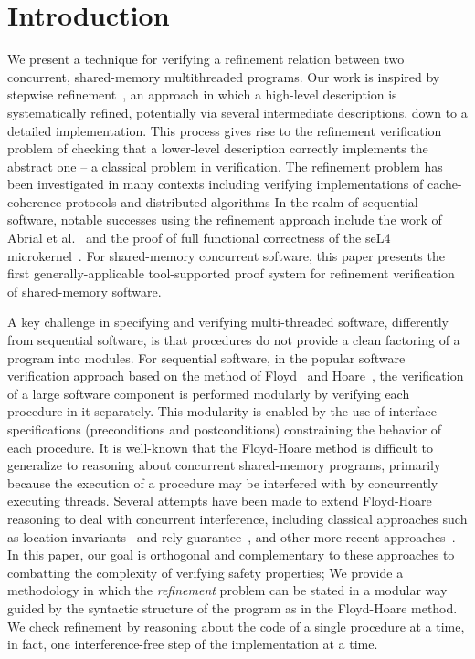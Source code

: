 \section{Introduction}
\label{sec:introduction}

We present a technique for verifying a refinement relation between two concurrent, shared-memory multithreaded programs. 
Our work is inspired by stepwise refinement~\cite{Wirth1971}, an approach in which a high-level description is systematically refined, 
potentially via several intermediate descriptions, down to a detailed implementation. 
This process gives rise to the refinement verification problem of checking that a lower-level description correctly implements the abstract one -- a classical problem in verification.
The refinement problem has been investigated in many contexts including verifying implementations of cache-coherence protocols and distributed algorithms
In the realm of sequential software, notable successes using the refinement approach include the work of Abrial et al.~\cite{AbrialBHHMV10} and the proof of full functional correctness of the seL4 microkernel~\cite{KleinAEMSKH14}. For shared-memory concurrent software, this paper presents the first generally-applicable tool-supported proof system for refinement verification of shared-memory software. 

A key challenge in specifying and verifying multi-threaded software, differently from sequential software, is that procedures do not provide a clean factoring of a program into modules. 
For sequential software, in the popular software verification approach based on the method of Floyd~\cite{Floyd67} and Hoare~\cite{Hoare69}, the verification of a large software component is performed modularly by verifying each procedure in it separately.
This modularity is enabled by the use of interface specifications (preconditions and postconditions) constraining the behavior of each procedure.
It is well-known that the Floyd-Hoare method is difficult to generalize to reasoning about concurrent shared-memory programs,
primarily because the execution of a procedure may be interfered with by concurrently executing threads.
Several attempts have been made to extend Floyd-Hoare reasoning to deal with concurrent interference, 
including classical approaches such as location invariants~\cite{Ashcroft75,OwickiG76} and rely-guarantee~\cite{Jones83},
and other more recent approaches~\cite{OHearn07,RGSep}. 
In this paper, our goal is orthogonal and complementary to these approaches to combatting the complexity of verifying safety properties; We provide a methodology in which the {\em refinement} problem can be stated in a modular way guided by the syntactic structure of the program as in the Floyd-Hoare method. 
We check refinement by reasoning about the code of a single procedure at a time, in fact, one interference-free step of the implementation at a time. 

